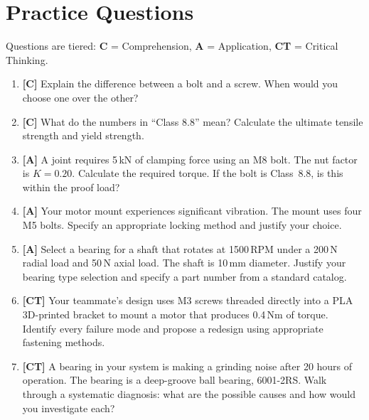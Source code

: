 \documentclass[11pt,letterpaper,twoside,openany]{book}
\begin{document}
\section{Practice Questions}
Questions are tiered: \textbf{C} = Comprehension, \textbf{A} = Application, \textbf{CT} = Critical Thinking.
\begin{enumerate}[leftmargin=1.5em]
\item \textbf{[C]} Explain the difference between a bolt and a screw. When would you choose one over the other?
\item \textbf{[C]} What do the numbers in ``Class 8.8'' mean? Calculate the ultimate tensile strength and yield strength.
\item \textbf{[A]} A joint requires 5\,kN of clamping force using an M8 bolt. The nut factor is $K = 0.20$. Calculate the required torque. If the bolt is Class~8.8, is this within the proof load?
\item \textbf{[A]} Your motor mount experiences significant vibration. The mount uses four M5 bolts. Specify an appropriate locking method and justify your choice.
\item \textbf{[A]} Select a bearing for a shaft that rotates at 1500\,RPM under a 200\,N radial load and 50\,N axial load. The shaft is 10\,mm diameter. Justify your bearing type selection and specify a part number from a standard catalog.
\item \textbf{[CT]} Your teammate's design uses M3 screws threaded directly into a PLA 3D-printed bracket to mount a motor that produces 0.4\,Nm of torque. Identify every failure mode and propose a redesign using appropriate fastening methods.
\item \textbf{[CT]} A bearing in your system is making a grinding noise after 20 hours of operation. The bearing is a deep-groove ball bearing, 6001-2RS. Walk through a systematic diagnosis: what are the possible causes and how would you investigate each?
\end{enumerate}
\end{document}
